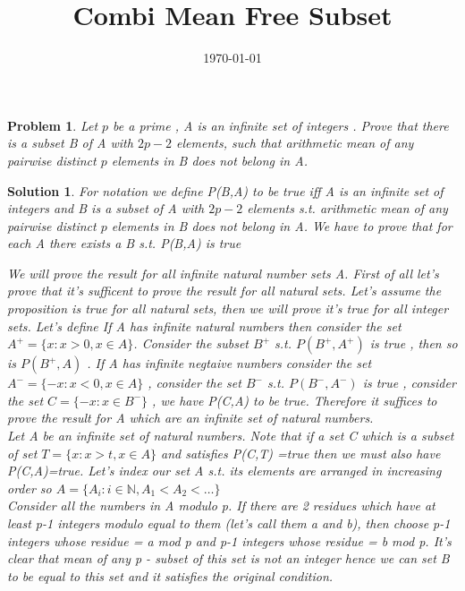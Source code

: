 \documentclass{article}
\title{Combi Mean Free Subset}
\date{\today}
\newtheorem*{problem}{Problem}
\newtheorem*{solution}{Solution}
\begin{document}
	
	\maketitle
	
	\begin{problem}
		Let $p$ be a prime , A is an infinite set of integers . Prove that there is a subset B of A with $2p-2$ elements, such that arithmetic mean of any pairwise distinct $p$ elements in B does not belong in A.
	\end{problem}
	
	\begin{solution}
		For notation we define P(B,A) to be true iff A is an infinite set of integers and B is a subset of A with $2p-2$ elements s.t. arithmetic mean of any pairwise distinct $p$ elements in B does not belong in A. We have to prove that for each A there exists a B s.t. P(B,A) is true
		
		We will prove the result for all infinite natural number sets A. First of all let's prove that it's sufficent to prove the result for all natural sets. Let's assume the proposition is true for all natural sets, then we will prove it's true for all integer sets. Let's define  If A has infinite natural numbers then consider the set $A^{+} = \{x: x>0 , x \in A \}$. Consider the subset $B^{+}$ s.t. $P(B^{+},A^{+})$ is true , then so is $P(B^{+},A)$ . If A has infinite negtaive numbers consider the set $A^{-} = \{-x: x<0 , x \in A \}$ ,  consider the set $B^{-}$ s.t. $P(B^{-},A^{-})$ is true , consider the set $C=\{-x: x\in B^{-}\}$ , we have P(C,A) to be true. Therefore it suffices to prove the result for A which are an infinite set of natural numbers.
		\\

		Let A be an infinite set of natural numbers. Note that if a set C which is a subset of set $T=\{x: x>t , x \in A \}$ and satisfies P(C,T) =true then we must also have P(C,A)=true. 
		Let's index our set A s.t. its elements are arranged in increasing order so $A= \{A_{i}: i \in \mathbb{N}, A_{1} < A_{2} < \dots \}$
		\\ 
		
		Consider all the numbers in A modulo p. If there are 2 residues which have at least p-1 integers modulo equal to them (let's call them a and b), then choose p-1 integers whose residue = a mod p and p-1 integers whose residue = b mod p. It's clear that mean of any p - subset of this set is not an integer hence we can set B to be equal to this set and it satisfies the original condition. 
		

\end{solution}
\end{document}
